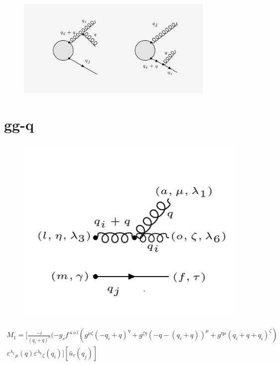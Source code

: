 

\begin{figure}[ht!]
\centering
\includegraphics[width=0.85\textwidth]{images/ggq-diagrams.png}
\end{figure}
\pagebreak
\section{gg-q}
\begin{figure}[ht!]
\centering
\includegraphics[scale=0.7]{images/ggqM1.png}
\end{figure}
\begin{equation}
\begin{split}
M_1=[\frac{-i}{(q_i +q)^2}(-g_s f^{\:a\:o\:l}(g^{{\mu}{\zeta}}(-q_i +q)^{\eta}+g^{{\zeta}{\eta}}(-q-(q_i +q))^{\mu}+g^{{\eta}{\mu}}(q_i +q+q_i)^{\zeta})\\
{\varepsilon^{\lambda_1}}_{\mu} (q) {\varepsilon^{\lambda_6}}_{\zeta} (q_i)][\bar{u}_{\tau}(q_j)]
\end{split}
\end{equation}


